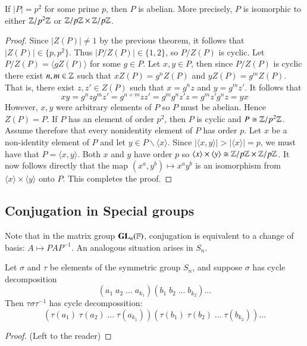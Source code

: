 \documentclass[12pt, a4paper, oneside, openright, titlepage]{book}
\begin{document}
\begin{cor}
    If $|P| = p^2$ for some prime $p$, then $P$ is abelian. More precisely, $P$ is isomorphic to either $\mathbb Z/p^2\mathbb Z$ or $\mathbb Z/p\mathbb Z\times \mathbb Z/p\mathbb Z$.
\end{cor}
\begin{proof}
    Since $|Z(P)| \neq 1$ by the previous theorem, it follows that $|Z(P)| \in \{p,p^2\}$. Thus $|P/Z(P)| \in \{1,2\}$, so $P/Z(P)$ is cyclic. Let $P/Z(P) = \langle gZ(P)\rangle$ for some $g \in P$. Let $x,y \in P$, then since $P/Z(P)$ is cyclic there exist $n,m \in \mathbb Z$ such that $xZ(P) = g^nZ(P)$ and $yZ(P) = g^mZ(P)$. That is, there exist $z,z' \in Z(P)$ such that $x = g^nz$ and $y = g^mz'$. It follows that \begin{equation*}
        xy = g^nzg^mz' = g^{n+m}zz' = g^mg^nz'z = g^mz'g^nz = yx
    \end{equation*}
    However, $x,y$ were arbitrary elements of $P$ so $P$ must be abelian. Hence $Z(P) = P$. If $P$ has an element of order $p^2$, then $P$ is cyclic and $P \cong \mathbb Z/p^2\mathbb Z$. Assume therefore that every nonidentity element of $P$ has order $p$. Let $x$ be a non-identity element of $P$ and let $y \in P\backslash\langle x\rangle$. Since $|\langle x,y \rangle| > |\langle x\rangle|=p$, we must have that $P = \langle x,y\rangle$. Both $x$ and $y$ have order $p$ so $\langle x\rangle\times \langle y\rangle \cong \mathbb Z/p\mathbb Z\times \mathbb Z/p\mathbb Z$. It now follows directly that the map $(x^a,y^b)\mapsto x^ay^b$ is an isomorphism from $\langle x\rangle\times \langle y\rangle$ onto $P$. This completes the proof.
\end{proof}

\subsection{\textsection Conjugation in Special groups}

\begin{rmk}
    Note that in the matrix group $\mathbf{GL}_n(\mathbb F)$, conjugation is equivalent to a change of basis: $A \mapsto PAP^{-1}$. An analogous situation arises in $S_n$.
\end{rmk}

\begin{prop}
    Let $\sigma$ and $\tau$ be elements of the symmetric group $S_n$, and suppose $\sigma$ has cycle decomposition \begin{equation*}
        (a_1\;a_2\;...\;a_{k_1})(b_1\;b_2\;...\;b_{k_2})...
    \end{equation*}
    Then $\tau\sigma\tau^{-1}$ has cycle decompossition: \begin{equation*}
        (\tau(a_1)\;\tau(a_2)\;...\;\tau(a_{k_1}))(\tau(b_1)\;\tau(b_2)\;...\;\tau(b_{k_2}))...
    \end{equation*}
\end{prop}
\begin{proof}
    (Left to the reader)
\end{proof}
\end{document}

